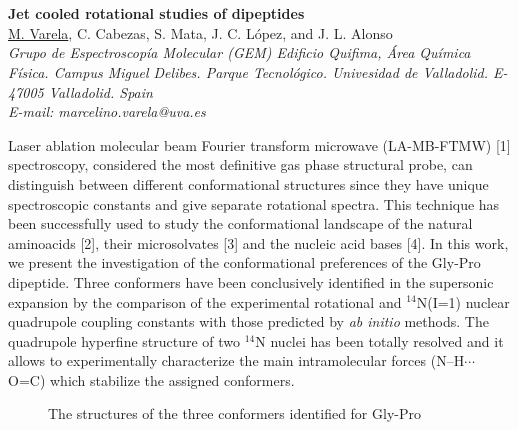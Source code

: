 \section*{}
\begin{center}
{\bf \Large
Jet cooled rotational studies of dipeptides
}
\\
\vspace{0.5cm}
\underline{M. Varela}, C. Cabezas, S. Mata, J. C. López, and J. L. Alonso
\\
\vspace{0.5cm}
{\it
Grupo de Espectroscopía Molecular (GEM) Edificio Quifima, Área Química Física. Campus Miguel
Delibes. Parque Tecnológico. Univesidad de Valladolid. E-47005
Valladolid. Spain
}
\\
\vspace{0.5cm}
{\it E-mail: marcelino.varela@uva.es}
\\
\vspace{0.5cm}
\end{center}
Laser ablation molecular beam Fourier transform microwave (LA-MB-FTMW) [1]
spectroscopy, considered the most definitive gas phase structural probe, can
distinguish between different conformational structures since they have unique
spectroscopic constants and give separate rotational spectra. This technique has been
successfully used to study the conformational landscape of the natural aminoacids
[2], their microsolvates [3] and the nucleic acid bases [4]. In this work, we present
the investigation of the conformational preferences of the Gly-Pro dipeptide. Three
conformers have been conclusively identified in the supersonic expansion by the
comparison of the experimental rotational and $^{14}$N(I=1) nuclear quadrupole coupling
constants with those predicted by \textit{ab initio} methods. The quadrupole hyperfine
structure of two $^{14}$N nuclei has been totally resolved and it allows to experimentally
characterize the main intramolecular forces (N--H$\cdots$O=C) which stabilize the assigned
conformers.
\\
\begin{figure}[h]
{}
{}
{}
 \caption[]{The structures of the three conformers identified for Gly-Pro}
\end{figure}
\\
